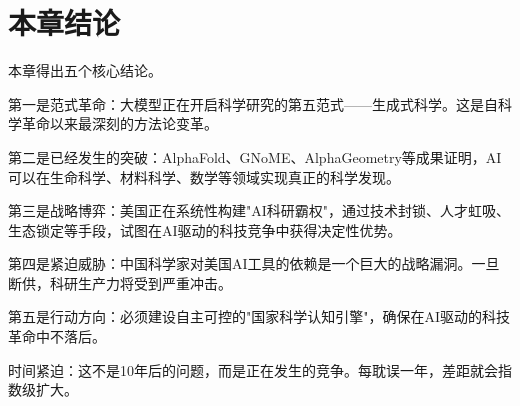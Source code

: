 \section{本章结论}

本章得出五个核心结论。

第一是范式革命：大模型正在开启科学研究的第五范式——生成式科学。这是自科学革命以来最深刻的方法论变革。

第二是已经发生的突破：AlphaFold、GNoME、AlphaGeometry等成果证明，AI可以在生命科学、材料科学、数学等领域实现真正的科学发现。

第三是战略博弈：美国正在系统性构建"AI科研霸权"，通过技术封锁、人才虹吸、生态锁定等手段，试图在AI驱动的科技竞争中获得决定性优势。

第四是紧迫威胁：中国科学家对美国AI工具的依赖是一个巨大的战略漏洞。一旦断供，科研生产力将受到严重冲击。

第五是行动方向：必须建设自主可控的"国家科学认知引擎"，确保在AI驱动的科技革命中不落后。

时间紧迫：这不是10年后的问题，而是正在发生的竞争。每耽误一年，差距就会指数级扩大。

